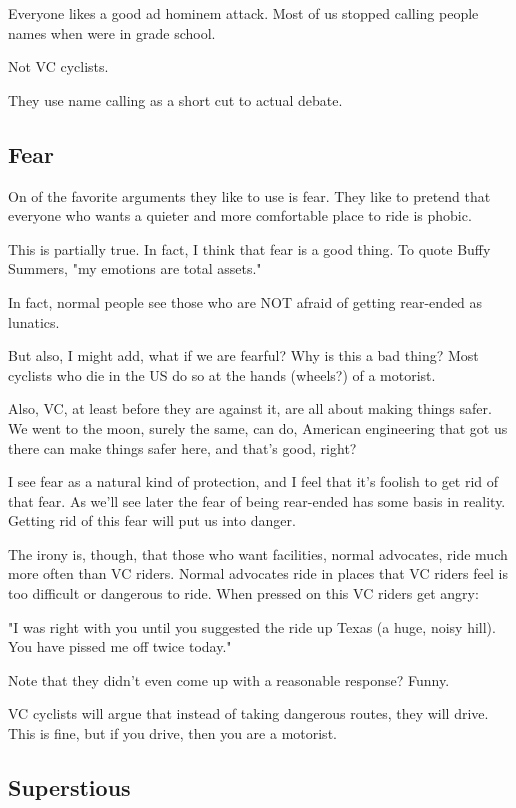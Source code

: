 Everyone likes a good ad hominem attack. Most of us stopped calling people names when were in grade school. 

Not VC cyclists.

They use name calling as a short cut to actual debate.

\subsection{Fear}

On of the favorite arguments they like to use is fear. They like to pretend that everyone who wants a quieter and more comfortable place to ride is phobic.

This is partially true. In fact, I think that fear is a good thing. To quote
Buffy Summers, "my emotions are total assets."

In fact, normal people see those who are NOT afraid of getting rear-ended as lunatics.

But also, I might add, what if we are fearful? Why is this a bad thing? Most cyclists who die in the US do so at the hands (wheels?) of a motorist.

Also, VC, at least before they are against it, are all about making things
safer. We went to the moon, surely the same, can do, American engineering that
got us there can make things safer here, and that's good, right?

I see fear as a natural kind of protection, and I feel that it's foolish to get
rid of that fear. As we'll see later the fear of being rear-ended has some
basis in reality. Getting rid of this fear will put us into danger.

The irony is, though, that those who want facilities, normal advocates, ride much more often than VC riders. Normal advocates ride in places that VC riders feel is too difficult or dangerous to ride. When pressed on this VC riders get angry:

"I was right with you until you suggested the ride up Texas (a huge, noisy hill). You have pissed me off twice today."

Note that they didn't even come up with a reasonable response? Funny.

VC cyclists will argue that instead of taking dangerous routes, they will drive. This is fine, but if you drive, then you are a motorist.

\subsection{Superstious} 

